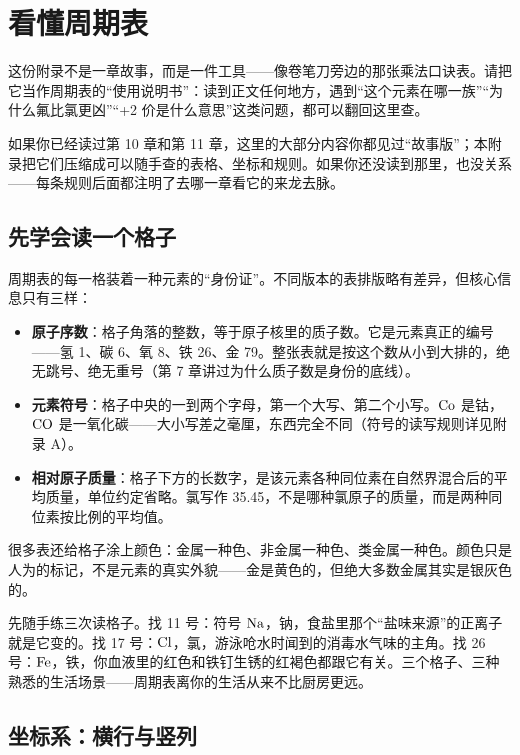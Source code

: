 \chapter{看懂周期表}

\begin{kaichang}
这份附录不是一章故事，而是一件工具——像卷笔刀旁边的那张乘法口诀表。请把它当作周期表的“使用说明书”：读到正文任何地方，遇到“这个元素在哪一族”“为什么氟比氯更凶”“+2 价是什么意思”这类问题，都可以翻回这里查。

如果你已经读过第 10 章和第 11 章，这里的大部分内容你都见过“故事版”；本附录把它们压缩成可以随手查的表格、坐标和规则。如果你还没读到那里，也没关系——每条规则后面都注明了去哪一章看它的来龙去脉。
\end{kaichang}

\section{先学会读一个格子}

周期表的每一格装着一种元素的“身份证”。不同版本的表排版略有差异，但核心信息只有三样：

\begin{itemize}[itemsep=2pt]
\item \textbf{原子序数}：格子角落的整数，等于原子核里的质子数。它是元素真正的编号——氢 1、碳 6、氧 8、铁 26、金 79。整张表就是按这个数从小到大排的，绝无跳号、绝无重号（第 7 章讲过为什么质子数是身份的底线）。
\item \textbf{元素符号}：格子中央的一到两个字母，第一个大写、第二个小写。$\mathrm{Co}$ 是钴，$\mathrm{CO}$ 是一氧化碳——大小写差之毫厘，东西完全不同（符号的读写规则详见附录 A）。
\item \textbf{相对原子质量}：格子下方的长数字，是该元素各种同位素在自然界混合后的平均质量，单位约定省略。氯写作 35.45，不是哪种氯原子的质量，而是两种同位素按比例的平均值。
\end{itemize}

很多表还给格子涂上颜色：金属一种色、非金属一种色、类金属一种色。颜色只是人为的标记，不是元素的真实外貌——金是黄色的，但绝大多数金属其实是银灰色的。

先随手练三次读格子。找 11 号：符号 $\mathrm{Na}$，钠，食盐里那个“盐味来源”的正离子就是它变的。找 17 号：$\mathrm{Cl}$，氯，游泳呛水时闻到的消毒水气味的主角。找 26 号：$\mathrm{Fe}$，铁，你血液里的红色和铁钉生锈的红褐色都跟它有关。三个格子、三种熟悉的生活场景——周期表离你的生活从来不比厨房更远。

\section{坐标系：横行与竖列}

